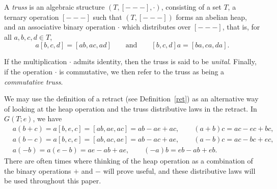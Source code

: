 \documentclass[10pt,a4paper]{amsart}
\numberwithin{equation}{section}
\begin{document}
\begin{Definition}\label{truss}
A \textit{truss} is an algebraic structure $(T,[---],\cdot)$, consisting of a set $T$, a ternary operation $[---]$ such that $(T,[---])$ forms an abelian heap, and an associative binary operation $\cdot$ which distributes over $[---]$, that is, for all $a,b,c,d \in T$,
\[
 a[b,c,d] = [ab,ac,ad] \qquad \text{and} \qquad
 [b,c,d]a=[ba,ca,da].
\]

If the multiplication $\cdot$ admits identity, then the truss is said to be \textit{unital}. Finally, if the operation $\cdot$ is commutative, we then refer to the truss as being a \textit{commutative truss}.
\end{Definition}
\begin{Remark} We may use the definition of a retract (see Definition~\ref{ret}) as an alternative way of looking at the heap operation and the truss distributive laws in the retract. In $G(T;e)$, we have
\begin{align*}
& a(b+c) = a[b,e,c] = [ab,ae,ac] = ab-ae+ac, \qquad (a+b)c = ac-ec+bc,\\
& a(b-c) = a[b,c,e] = [ab,ac,ae] = ab-ac+ae, \qquad (a-b)c = ac-bc+ec, \\
& a(-b) = a(e-b)= ae-ab+ae, \qquad (-a)b = eb-ab+eb.
 \end{align*}
There are often times where thinking of the heap operation as a combination of the binary operations $+$ and $-$ will prove useful, and these distributive laws will be used throughout this paper.
\end{Remark}
\end{document}

